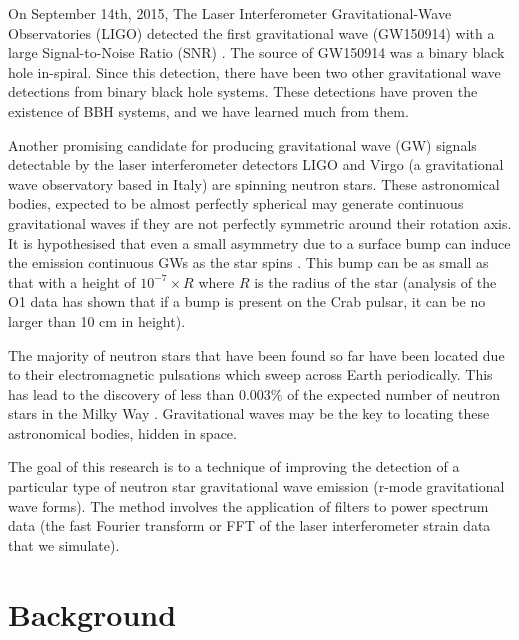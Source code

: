 \documentclass[%
reprint,
amsmath,amssymb,
aps,
]{revtex4-1}
\begin{document}
	
	
	On September 14th, 2015, The Laser Interferometer Gravitational-Wave Observatories (LIGO) detected the first gravitational wave (GW150914) with a large Signal-to-Noise Ratio (SNR) \cite{DetectionPaper}. The source of GW150914 was a binary black hole in-spiral. Since this detection, there have been two other gravitational wave detections from binary black hole systems. These detections have proven the existence of BBH systems, and we have learned much from them.
	
	Another promising candidate for producing gravitational wave (GW) signals detectable by the laser interferometer detectors LIGO and Virgo (a gravitational wave observatory based in Italy) are spinning neutron stars. These astronomical bodies, expected to be almost perfectly spherical may generate continuous gravitational waves if they are not perfectly symmetric around their rotation axis.   It is hypothesised that even a small asymmetry due to a surface bump can induce the emission continuous GWs as the star spins \cite{jones2002gravitational}. This bump can be as small as that with a height of $10^{-7} \times R$ where $R$ is the radius of the star (analysis of the O1 data has shown that if a bump is present on the Crab pulsar, it can be no larger than 10 cm in height).
	
	The majority of neutron stars that have been found so far have been located due to their electromagnetic pulsations which sweep across Earth periodically. This has lead to the discovery of less than $0.003\%$ of the expected number of neutron stars in the Milky Way \cite{meadors2017searches}. Gravitational waves may be the key to locating these astronomical bodies, hidden in space. 
	
	The goal of this research is to a technique of improving the detection of a particular type of neutron star gravitational wave emission (r-mode gravitational wave forms). The method involves the application of filters to power spectrum data (the fast Fourier transform or FFT of the laser interferometer strain data that we simulate). 
	
	
	
	
	\section{Background}
	
\end{document}
